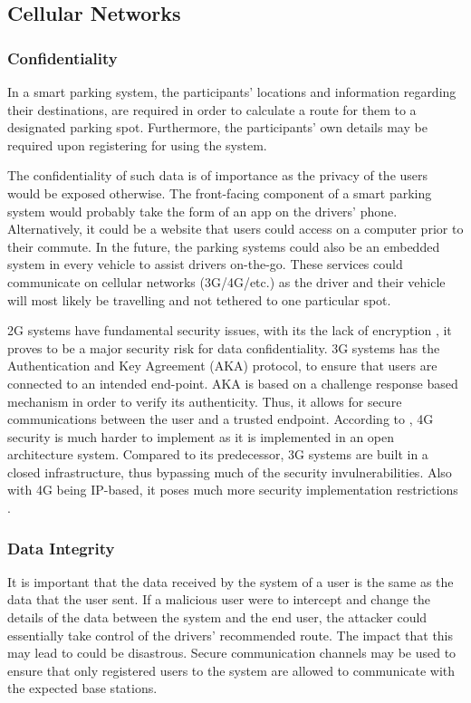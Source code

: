 \subsection{Cellular Networks}
\subsubsection{Confidentiality}
In a smart parking system, the participants' locations and information regarding their destinations, are required in order to calculate a route for them to a designated parking spot. Furthermore, the participants' own details may be required upon registering for using the system.

The confidentiality of such data is of importance as the privacy of the users would be exposed otherwise. The front-facing component of a smart parking system would probably take the form of an app on the drivers' phone. Alternatively, it could be a website that users could access on a computer prior to their commute. In the future, the parking systems could also be an embedded system in every vehicle to assist drivers on-the-go. These services could communicate on cellular networks (3G/4G/etc.) as the driver and their vehicle will most likely be travelling and not tethered to one particular spot.

2G systems have fundamental security issues, with its the lack of encryption \citep{simate2013evaluation}, it proves to be a major security risk for data confidentiality. 3G systems has the Authentication and Key Agreement (AKA) protocol, to ensure that users are connected to an intended end-point. AKA is based on a challenge response based mechanism in order to verify its authenticity. Thus, it allows for secure communications between the user and a trusted endpoint. According to \citep{shirbhate2012providing}, 4G security is much harder to implement as it is implemented in an open architecture system. Compared to its predecessor, 3G systems are built in a closed infrastructure, thus bypassing much of the security invulnerabilities. Also with 4G being IP-based, it poses much more security implementation restrictions \citep{park2007survey}.

\subsubsection{Data Integrity}
It is important that the data received by the system of a user is the same as the data that the user sent. If a malicious user were to intercept and change the details of the data between the system and the end user, the attacker could essentially take control of the drivers' recommended route. The impact that this may lead to could be disastrous. Secure communication channels may be used to ensure that only registered users to the system are allowed to communicate with the expected base stations. 


